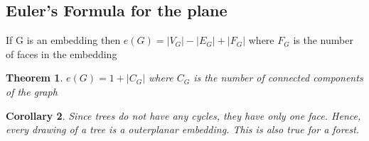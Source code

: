 \documentclass{article}
\newcounter{lecnum}
\newtheorem{theorem}{Theorem}[lecnum]
\newtheorem{corollary}[theorem]{Corollary}
\begin{document}
\subsection{Euler's Formula for the plane}
If G is an embedding then
$e(G) = |V_G| - |E_G| + |F_G|$ 
where $F_G$ is the number of faces in the embedding

\begin{theorem}
 $e(G) = 1 + |C_G|$ where $C_G$ is the number of connected components of the graph
\end{theorem}

\begin{corollary}
Since trees do not have any cycles, they have only one face. Hence, every drawing of a tree is a outerplanar embedding.
This is also true for a forest.
\end{corollary}
\end{document}
